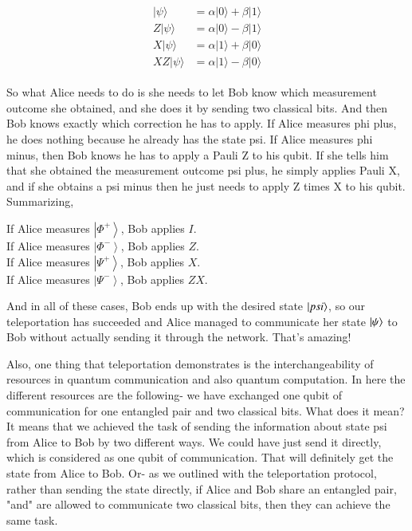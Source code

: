 \begin{align}
\begin{aligned}
|\psi\rangle &=\alpha|0\rangle+\beta|1\rangle \\
Z|\psi\rangle &=\alpha|0\rangle-\beta|1\rangle \\
X|\psi\rangle &=\alpha|1\rangle+\beta|0\rangle \\
X Z|\psi\rangle &=\alpha|1\rangle-\beta|0\rangle
\end{aligned}
\end{align}

So what Alice needs to do is she needs to let Bob know which measurement outcome she obtained, and she does it by sending two classical bits. And then Bob knows exactly which correction he has to apply. If Alice measures phi plus, he does nothing because he already has the state psi. If Alice measures phi minus, then Bob knows he has to apply a Pauli Z to his qubit. If she tells him that she obtained the measurement outcome psi plus, he simply applies Pauli X, and if she obtains a psi minus then he just needs to apply Z times X to his qubit.  Summarizing,

\noindent
If Alice measures $\left|\Phi^{+}\right\rangle$, Bob applies $I$.\\
If Alice measures $\left|\Phi^{-}\right\rangle$, Bob applies $Z$.\\
If Alice measures $\left|\Psi^{+}\right\rangle$, Bob applies $X$.\\
If Alice measures $\left|\Psi^{-}\right\rangle$, Bob applies $Z X$.

And in all of these cases, Bob ends up with the desired state $\ket{psi}$, so our teleportation has succeeded and Alice managed to communicate her state $\ket{\psi}$ to Bob without actually sending it through the network. That's amazing!

Also, one thing that teleportation demonstrates is the interchangeability of resources in quantum communication and also quantum computation. In here the different resources are the following- we have exchanged one qubit of communication for one entangled pair and two classical bits. What does it mean? It means that we achieved the task of sending the information about state psi from Alice to Bob by two different ways. We could have just send it directly, which is considered as one qubit of communication. That will definitely get the state from Alice to Bob. Or- as we outlined with the teleportation protocol, rather than sending the state directly, if Alice and Bob share an entangled pair, "and" are allowed to communicate two classical bits, then they can achieve the same task.

